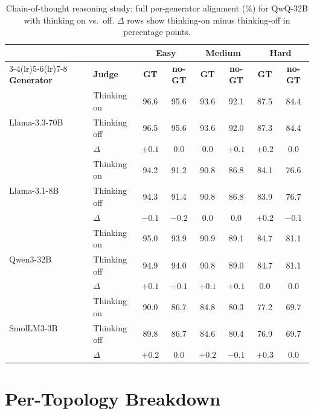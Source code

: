 \begin{table}[!htbp]
\centering
\small
\setlength{\tabcolsep}{4pt}
\renewcommand{\arraystretch}{1.05}
\caption{Chain-of-thought reasoning study: full per-generator alignment (\%) for QwQ-32B with thinking on vs.\ off. $\Delta$ rows show thinking-on minus thinking-off in percentage points.}
\label{tab:app-abl-e6}
\begin{tabular}{@{}llcccccc@{}}
\toprule
 & & \multicolumn{2}{c}{\textbf{Easy}} & \multicolumn{2}{c}{\textbf{Medium}} & \multicolumn{2}{c}{\textbf{Hard}} \\
\cmidrule(lr){3-4}\cmidrule(lr){5-6}\cmidrule(lr){7-8}
\textbf{Generator} & \textbf{Judge} & \textbf{GT} & \textbf{no-GT} & \textbf{GT} & \textbf{no-GT} & \textbf{GT} & \textbf{no-GT} \\
\midrule
\multirow{3}{*}{Llama-3.3-70B}
  & Thinking on  & 96.6 & 95.6 & 93.6 & 92.1 & 87.5 & 84.4 \\
  & Thinking off & 96.5 & 95.6 & 93.6 & 92.0 & 87.3 & 84.4 \\
  & $\Delta$     & $+0.1$ & $0.0$ & $0.0$ & $+0.1$ & $+0.2$ & $0.0$ \\
\midrule
\multirow{3}{*}{Llama-3.1-8B}
  & Thinking on  & 94.2 & 91.2 & 90.8 & 86.8 & 84.1 & 76.6 \\
  & Thinking off & 94.3 & 91.4 & 90.8 & 86.8 & 83.9 & 76.7 \\
  & $\Delta$     & $-0.1$ & $-0.2$ & $0.0$ & $0.0$ & $+0.2$ & $-0.1$ \\
\midrule
\multirow{3}{*}{Qwen3-32B}
  & Thinking on  & 95.0 & 93.9 & 90.9 & 89.1 & 84.7 & 81.1 \\
  & Thinking off & 94.9 & 94.0 & 90.8 & 89.0 & 84.7 & 81.1 \\
  & $\Delta$     & $+0.1$ & $-0.1$ & $+0.1$ & $+0.1$ & $0.0$ & $0.0$ \\
\midrule
\multirow{3}{*}{SmolLM3-3B}
  & Thinking on  & 90.0 & 86.7 & 84.8 & 80.3 & 77.2 & 69.7 \\
  & Thinking off & 89.8 & 86.7 & 84.6 & 80.4 & 76.9 & 69.7 \\
  & $\Delta$     & $+0.2$ & $0.0$ & $+0.2$ & $-0.1$ & $+0.3$ & $0.0$ \\
\bottomrule
\end{tabular}
\end{table}

\section{Per-Topology Breakdown}
\label{app:pertopology-table}

